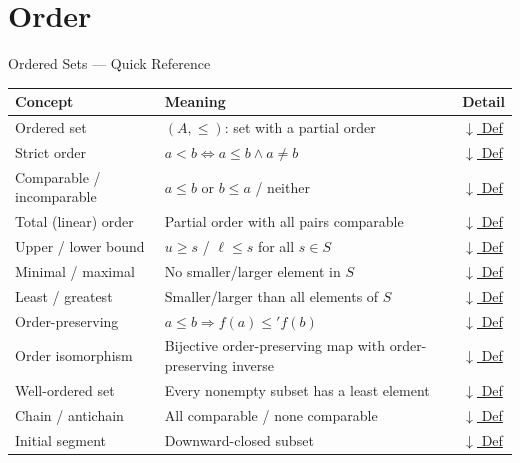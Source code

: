 \section{Order}

%

\begin{toolkitbox}{Ordered Sets --- Quick Reference}
\small
\begin{tabular}{l l l}
\toprule
\textbf{Concept} & \textbf{Meaning} & \textbf{Detail} \\
\midrule
Ordered set        & $(A, \leq)$: set with a partial order                        & \hyperref[def:ordered-set]{$\downarrow$ Def} \\
Strict order       & $a < b \iff a \leq b \land a \neq b$                         & \hyperref[def:strict-order]{$\downarrow$ Def} \\
Comparable / incomparable & $a \leq b$ or $b \leq a$ / neither              & \hyperref[def:comparable]{$\downarrow$ Def} \\
Total (linear) order & Partial order with all pairs comparable                  & \hyperref[def:linear-order]{$\downarrow$ Def} \\
Upper / lower bound & $u \geq s$ / $\ell \leq s$ for all $s \in S$               & \hyperref[def:bounds]{$\downarrow$ Def} \\
Minimal / maximal  & No smaller/larger element in $S$                            & \hyperref[def:min-max]{$\downarrow$ Def} \\
Least / greatest   & Smaller/larger than all elements of $S$                     & \hyperref[def:least-greatest]{$\downarrow$ Def} \\
Order-preserving   & $a \leq b \Rightarrow f(a) \leq' f(b)$                       & \hyperref[def:order-pres]{$\downarrow$ Def} \\
Order isomorphism  & Bijective order-preserving map with order-preserving inverse & \hyperref[def:order-iso]{$\downarrow$ Def} \\
Well-ordered set   & Every nonempty subset has a least element                   & \hyperref[def:well-order]{$\downarrow$ Def} \\
Chain / antichain  & All comparable / none comparable                            & \hyperref[def:chain]{$\downarrow$ Def} \\
Initial segment    & Downward-closed subset                                      & \hyperref[def:initial-segment]{$\downarrow$ Def} \\
\bottomrule
\end{tabular}
\end{toolkitbox}


